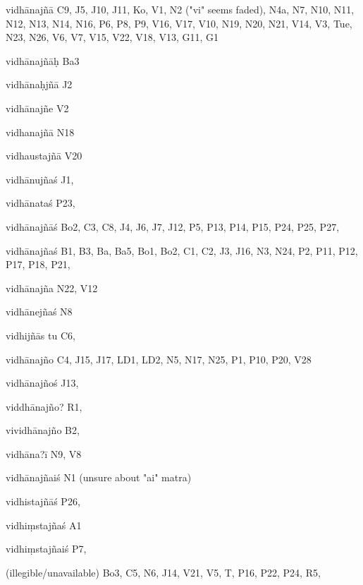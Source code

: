 \begin{ekdosis}
\begin{marma}[hp01_055]
\begin{marma}[hp02_009]
\begin{marma}[hp02_011]
 \begin{marma}[hp02_43a]
\item[vidhānajñā] C9, J5, J10, J11, Ko, V1, N2 ("vi" seems faded), N4a, N7, N10, N11, N12, N13, N14, N16, P6, P8, P9, V16, V17, V10, N19, N20, N21, V14, V3, Tue, N23, N26, V6, V7, V15, V22, V18, V13, G11, G1
\item[vidhānajñāḥ] Ba3
\item[vidhānaḥjñā] J2
\item[vidhānajñe] V2
\item[vidhanajñā] N18
\item[vidhaustajñā] V20
\item[vidhānujñaś] J1,
\item[vidhānataś] P23, 
\item[vidhānajñāś] Bo2, C3, C8, J4, J6, J7, J12, P5, P13, P14, P15, P24, P25, P27, 
\item[vidhānajñaś] B1, B3, Ba, Ba5, Bo1, Bo2, C1, C2, J3, J16, N3, N24, P2, P11, P12, P17, P18, P21, 
\item[vidhānajña] N22, V12
\item[vidhānejñaś] N8
\item[vidhijñās tu] C6,
\item[vidhānajño] C4, J15, J17, LD1, LD2, N5, N17, N25, P1, P10, P20, V28
\item[vidhānajñoś] J13, 
\item[viddhānajño?] R1,
\item[vividhānajño] B2, 
\item[vidhāna?ī] N9, V8
\item[vidhānajñaiś] N1 (unsure about "ai" matra)
\item[vidhistajñāś] P26,
\item[vidhiṃstajñaś] A1
\item[vidhiṃstajñaiś] P7,
\item[(illegible/unavailable)] Bo3, C5, N6, J14, V21, V5, T, P16, P22, P24, R5,
  \begin{description}

    \end{description}
 \end{marma}


\end{marma}
\end{marma}
\end{marma}
\end{ekdosis}
